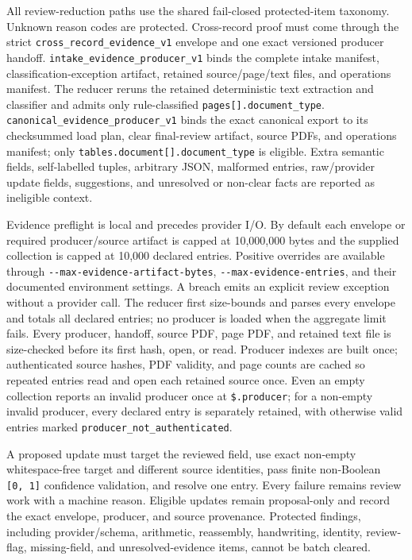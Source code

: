 \documentclass[
]{article}
\begin{document}
All review-reduction paths use the shared fail-closed protected-item
taxonomy. Unknown reason codes are protected. Cross-record proof must
come through the strict
\texttt{cross\_\allowbreak{}record\_\allowbreak{}evidence\_\allowbreak{}v1}
envelope and one exact versioned producer handoff.
\texttt{intake\_\allowbreak{}evidence\_\allowbreak{}producer\_\allowbreak{}v1}
binds the complete intake manifest, classification-exception artifact,
retained source/page/text files, and operations manifest. The reducer
reruns the retained deterministic text extraction and classifier and
admits only rule-classified
\texttt{pages[].document\_\allowbreak{}type}.
\texttt{canonical\_\allowbreak{}evidence\_\allowbreak{}producer\_\allowbreak{}v1}
binds the exact canonical export to its checksummed load plan, clear
final-review artifact, source PDFs, and operations manifest; only
\texttt{tables.document[].document\_\allowbreak{}type} is eligible.
Extra semantic fields, self-labelled tuples, arbitrary JSON, malformed
entries, raw/provider update fields, suggestions, and unresolved or
non-clear facts are reported as ineligible context.

Evidence preflight is local and precedes provider I/O. By default each
envelope or required producer/source artifact is capped at 10,000,000
bytes and the supplied collection is capped at 10,000 declared entries.
Positive overrides are available through
\texttt{-\/-max-evidence-artifact-bytes},
\texttt{-\/-max-evidence-entries}, and their documented environment
settings. A breach emits an explicit review exception without a provider
call. The reducer first size-bounds and parses every envelope and totals
all declared entries; no producer is loaded when the aggregate limit
fails. Every producer, handoff, source PDF, page PDF, and retained text
file is size-checked before its first hash, open, or read. Producer
indexes are built once; authenticated source hashes, PDF validity, and
page counts are cached so repeated entries read and open each retained
source once. Even an empty collection reports an invalid producer once
at \texttt{\$.producer}; for a non-empty invalid producer, every
declared entry is separately retained, with otherwise valid entries
marked \texttt{producer\_\allowbreak{}not\_\allowbreak{}authenticated}.

A proposed update must target the reviewed field, use exact non-empty
whitespace-free target and different source identities, pass finite
non-Boolean \texttt{{[}0,\ 1{]}} confidence validation, and resolve one
entry. Every failure remains review work with a machine reason. Eligible
updates remain proposal-only and record the exact envelope, producer,
and source provenance. Protected findings, including provider/schema,
arithmetic, reassembly, handwriting, identity, review-flag,
missing-field, and unresolved-evidence items, cannot be batch cleared.
\end{document}
